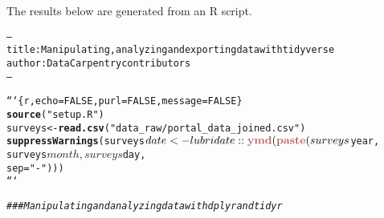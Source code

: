 \documentclass{article}\usepackage[]{graphicx}\usepackage[]{xcolor}
\makeatletter
\newcommand{\hlstr}[1]{\textcolor[rgb]{0.192,0.494,0.8}{#1}}%
\newcommand{\hlcom}[1]{\textcolor[rgb]{0.678,0.584,0.686}{\textit{#1}}}%
\newcommand{\hlkwd}[1]{\textcolor[rgb]{0.737,0.353,0.396}{\textbf{#1}}}%
\newenvironment{kframe}{%
 \def\at@end@of@kframe{}%
 \ifinner\ifhmode%
  \def\at@end@of@kframe{\end{minipage}}%
  \begin{minipage}{\columnwidth}%
 \fi\fi%
 \def\FrameCommand##1{\hskip\@totalleftmargin \hskip-\fboxsep
 \colorbox{shadecolor}{##1}\hskip-\fboxsep
     \hskip-\linewidth \hskip-\@totalleftmargin \hskip\columnwidth}%
 \MakeFramed {\advance\hsize-\width
   \@totalleftmargin\z@ \linewidth\hsize
   \@setminipage}}%
 {\par\unskip\endMakeFramed%
 \at@end@of@kframe}
\newenvironment{knitrout}{}{} %
\makeatother
\begin{document}
\title{\title{\title{\title{}}}}



\maketitle
The results below are generated from an R script.

\begin{knitrout}
\color{fgcolor}\begin{kframe}
\begin{alltt}
---
title: Manipulating, analyzing and exporting data with tidyverse
author: Data Carpentry contributors
---

```\{r, echo=FALSE, purl=FALSE, message = FALSE\}
\hlkwd{source}(\hlstr{"setup.R"})
surveys <- \hlkwd{read.csv}(\hlstr{"data_raw/portal_data_joined.csv"})
\hlkwd{suppressWarnings}(surveys$date <- lubridate::\hlkwd{ymd}(\hlkwd{paste}(surveys$year,
                                                      surveys$month,
                                                      surveys$day,
                                                      sep = \hlstr{"-"})))
```

\hlcom{### Manipulating and analyzing data with dplyr and tidyr}
\end{alltt}


{\ttfamily\noindent\bfseries{}}\end{kframe}
\end{knitrout}
\end{document}
